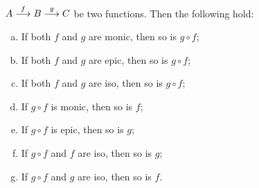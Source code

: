 \begin{lemma}
	$A\stackrel{f}{\longrightarrow}B\stackrel{g}{\longrightarrow}C$ be two functions. Then the following hold:
		\begin{enumerate}[(a)]
			\item If both $f$ and $g$ are monic, then so is $g\circ f$;
			\item If both $f$ and $g$ are epic, then so is $g\circ f$;
			\item If both $f$ and $g$ are iso, then so is $g\circ f$;
			\item If $g\circ f$ is monic, then so is $f$;
			\item If $g\circ f$ is epic, then so is $g$;
			\item If $g\circ f$ and $f$ are iso, then so is $g$;
			\item If $g\circ f$ and $g$ are iso, then so is $f$.
		\end{enumerate}
\end{lemma}
